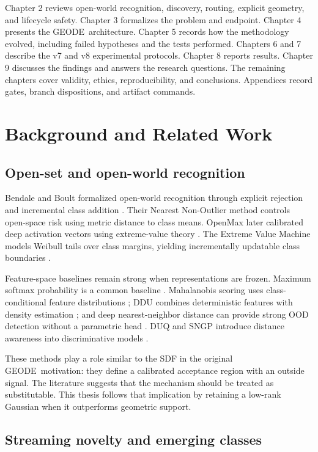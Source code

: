 \documentclass[12pt,oneside]{report}
\newcommand{\systemname}{GEODE}
\begin{document}
Chapter 2 reviews open-world recognition, discovery, routing, explicit
geometry, and lifecycle safety. Chapter 3 formalizes the problem and endpoint.
Chapter 4 presents the \systemname\ architecture. Chapter 5 records how the
methodology evolved, including failed hypotheses and the tests performed.
Chapters 6 and 7 describe the v7 and v8 experimental protocols. Chapter 8
reports results. Chapter 9 discusses the findings and answers the research
questions. The remaining chapters cover validity, ethics, reproducibility, and
conclusions. Appendices record gates, branch dispositions, and artifact
commands.

\chapter{Background and Related Work}

\section{Open-set and open-world recognition}

Bendale and Boult formalized open-world recognition through explicit rejection
and incremental class addition \cite{bendale2015}. Their Nearest Non-Outlier
method controls open-space risk using metric distance to class means. OpenMax
later calibrated deep activation vectors using extreme-value theory
\cite{bendale2016}. The Extreme Value Machine models Weibull tails over class
margins, yielding incrementally updatable class boundaries \cite{rudd2018}.

Feature-space baselines remain strong when representations are frozen.
Maximum softmax probability is a common baseline \cite{hendrycks2017}.
Mahalanobis scoring uses class-conditional feature distributions
\cite{lee2018}; DDU combines deterministic features with density estimation
\cite{mukhoti2023}; and deep nearest-neighbor distance can provide strong OOD
detection without a parametric head \cite{sun2022}. DUQ and SNGP introduce
distance awareness into discriminative models
\cite{vanamersfoort2020,liu2020}.

These methods play a role similar to the SDF in the original \systemname\
motivation: they define a calibrated acceptance region with an outside signal.
The literature suggests that the mechanism should be treated as substitutable.
This thesis follows that implication by retaining a low-rank Gaussian when it
outperforms geometric support.

\section{Streaming novelty and emerging classes}
\end{document}
